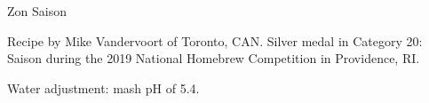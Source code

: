 \begin{recipe}{Zon Saison}

\begin{aboutblock}
Recipe by Mike Vandervoort of Toronto, CAN. Silver medal in Category 20: Saison
during the 2019 National Homebrew Competition in Providence, RI. \sourceaha
\end{aboutblock}


\begin{methodandtiming}
 
\begin{mashsteps}
\end{mashsteps}

\begin{fermentationsteps}
\end{fermentationsteps}

\begin{directions}
Water adjustment: mash pH of 5.4.
\end{directions}

\end{methodandtiming}

\recipebreak

\begin{ingredientsblock}

\begin{malts}
\end{malts}

\begin{hops}
\end{hops}


\end{ingredientsblock}

\end{recipe}

